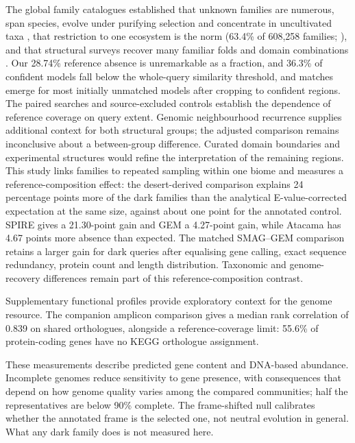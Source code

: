 \documentclass[11pt]{article}
\begin{document}
The global family catalogues established that unknown families are numerous, span species, evolve
under purifying selection and concentrate in uncultivated taxa
\citep{rodriguezdelrio2024fesnov,pavlopoulos2023darkmatter,vanni2022agnostos}, that restriction to
one ecosystem is the norm (63.4\% of 608{,}258 families; \citep{aplakidou2025quadrupling}), and
that structural surveys recover many familiar folds and domain combinations
\citep{lau2024ted,yeo2025afesm}. Our 28.74\% reference absence is unremarkable as a fraction, and
36.3\% of confident models fall below the whole-query similarity threshold, and
matches emerge for most initially unmatched models after cropping to confident regions. The paired searches and source-excluded controls establish the dependence of reference coverage on query extent. Genomic neighbourhood recurrence supplies additional context for both structural groups; the adjusted comparison remains inconclusive about a between-group difference. Curated domain boundaries and experimental structures would refine the interpretation of the remaining regions. This study links families to repeated sampling within one biome and measures a reference-composition effect: the desert-derived comparison explains 24 percentage points more of the dark families
than the analytical E-value-corrected expectation at the same size, against about one point for the annotated control. SPIRE gives a 21.30-point gain and GEM a 4.27-point gain, while Atacama has 4.67 points more absence than expected. The matched SMAG--GEM comparison retains a larger gain for dark queries after equalising gene calling, exact sequence redundancy, protein count and length distribution. Taxonomic and genome-recovery differences remain part of this reference-composition contrast.

Supplementary functional profiles provide exploratory context for the genome resource.
The companion amplicon comparison gives a median rank correlation of 0.839 on shared
orthologues, alongside a reference-coverage limit: 55.6\% of protein-coding genes have no
KEGG orthologue assignment.

These measurements describe predicted gene content and DNA-based abundance. Incomplete genomes
reduce sensitivity to gene presence, with consequences that depend on how genome quality varies
among the compared communities; half the representatives
are below 90\% complete. The frame-shifted null
calibrates whether the annotated frame is the selected one, not neutral evolution in general. What
any dark family does is not measured here.
\end{document}
